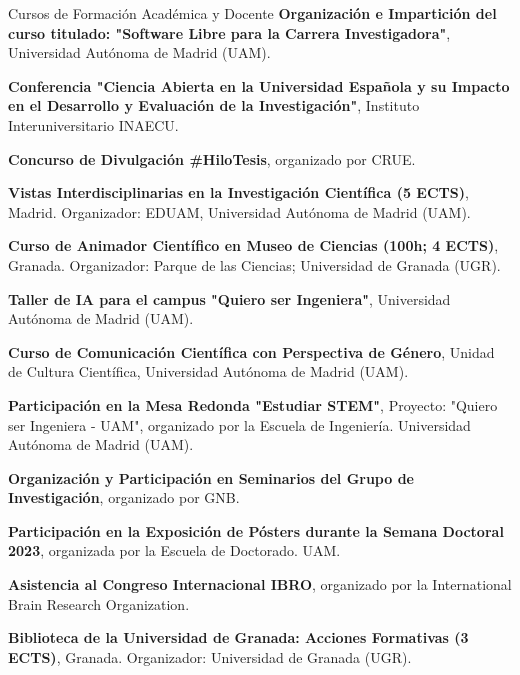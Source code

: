 \begin{rubric}{Cursos de Formación Académica y Docente}
	\entry*[4 y 11 de marzo de 2024] \textbf{Organización e Impartición del curso titulado: "Software Libre para la Carrera Investigadora"}, Universidad Autónoma de Madrid (UAM).
	
	\entry*[25 de enero de 2023] \textbf{Conferencia "Ciencia Abierta en la Universidad Española y su Impacto en el Desarrollo y Evaluación de la Investigación"}, Instituto Interuniversitario INAECU.
	
	\entry*[Mayo 2021] \textbf{Concurso de Divulgación \#HiloTesis}, organizado por CRUE.
	
	 \textbf{Vistas Interdisciplinarias en la Investigación Científica (5 ECTS)}, Madrid. Organizador: EDUAM, Universidad Autónoma de Madrid (UAM).
	
	 \textbf{Curso de Animador Científico en Museo de Ciencias (100h; 4 ECTS)}, Granada. Organizador: Parque de las Ciencias; Universidad de Granada (UGR).
	
	
	\entry*[Junio 2024] \textbf{Taller de IA para el campus "Quiero ser Ingeniera"}, Universidad Autónoma de Madrid (UAM).
	
	\entry*[Febrero 2024] \textbf{Curso de Comunicación Científica con Perspectiva de Género}, Unidad de Cultura Científica, Universidad Autónoma de Madrid (UAM).
	
	\entry*[Junio 2022] \textbf{Participación en la Mesa Redonda "Estudiar STEM"}, Proyecto: "Quiero ser Ingeniera - UAM", organizado por la Escuela de Ingeniería. Universidad Autónoma de Madrid (UAM).
	
	
	
	 \textbf{Organización y Participación en Seminarios del Grupo de Investigación}, organizado por GNB.
	
	\entry*[Junio 2023] \textbf{Participación en la Exposición de Pósters durante la Semana Doctoral 2023}, organizada por la Escuela de Doctorado. UAM.
	
	\entry*[Septiembre 2023] \textbf{Asistencia al Congreso Internacional IBRO}, organizado por la International Brain Research Organization.
	
	 \textbf{Biblioteca de la Universidad de Granada: Acciones Formativas (3 ECTS)}, Granada. Organizador: Universidad de Granada (UGR).
	
\end{rubric}